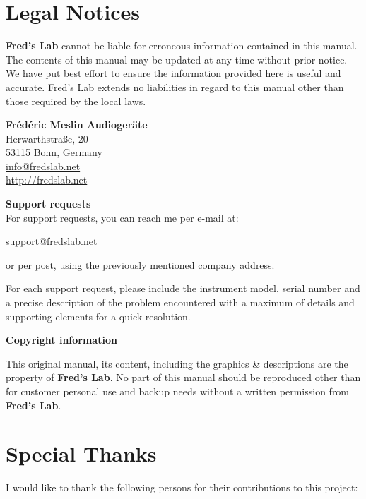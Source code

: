 \documentclass{scrartcl}
\begin{document}
\section{Legal Notices}

\textbf{Fred's Lab} cannot be liable for erroneous information contained in this manual. The contents of this manual may be updated at any time without prior notice. We have put best effort to ensure the information provided here is useful and accurate. Fred's Lab extends no liabilities in regard to this manual other than those required by the local laws.

\begin{center}
    \textbf{Frédéric Meslin Audiogeräte} \\
    Herwarthstraße, 20 \\
    53115 Bonn, Germany \\
    \url{info@fredslab.net} \\
    \url{http://fredslab.net} \\
\end{center}

\textbf{Support requests} \\
For support requests, you can reach me per e-mail at:
\begin{center}
    \url{support@fredslab.net}
\end{center}
or per post, using the previously mentioned company address.

For each support request, please include the instrument model, serial number and a precise description of the problem encountered with a maximum of details and supporting elements for a quick resolution.

\textbf{Copyright information}

This original manual, its content, including the graphics \& descriptions are the property of \textbf{Fred's Lab}. No part of this manual should be reproduced other than for customer personal use and backup needs without a written permission from \textbf{Fred's Lab}.

\pagebreak


\section{Special Thanks}

I would like to thank the following persons for their contributions to this project:
\end{document}
